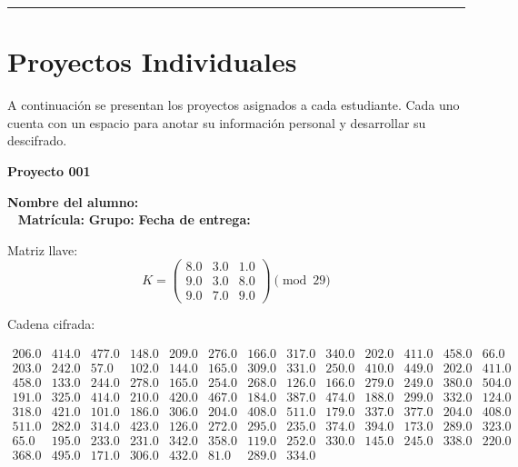 \documentclass[12pt]{article}
\begin{document}
\bigskip
\hrule
\bigskip

\section*{Proyectos Individuales}
A continuación se presentan los proyectos asignados a cada estudiante.
Cada uno cuenta con un espacio para anotar su información personal y desarrollar su descifrado.

\textbf{Proyecto 001}

\textbf{Nombre del alumno:} \underline{\hspace{13cm}}\\\
\vspace{1cm}
\textbf{Matrícula:} \underline{\hspace{4cm}} \hspace{1cm}
\textbf{Grupo:} \underline{\hspace{2cm}}
\textbf{Fecha de entrega:} \underline{\hspace{2cm}}

\medskip

Matriz llave:
\[
K = \begin{pmatrix}
8.0 & 3.0 & 1.0\\
9.0 & 3.0 & 8.0\\
9.0 & 7.0 & 9.0
\end{pmatrix} \pmod{29}
\]

Cadena cifrada:
\begin{center}
$\begin{array}{lllllllllllll}
206.0 & 414.0 & 477.0 & 148.0 & 209.0 & 276.0 & 166.0 & 317.0 & 340.0 & 202.0 & 411.0 & 458.0 & 66.0\\
203.0 & 242.0 & 57.0 & 102.0 & 144.0 & 165.0 & 309.0 & 331.0 & 250.0 & 410.0 & 449.0 & 202.0 & 411.0\\
458.0 & 133.0 & 244.0 & 278.0 & 165.0 & 254.0 & 268.0 & 126.0 & 166.0 & 279.0 & 249.0 & 380.0 & 504.0\\
191.0 & 325.0 & 414.0 & 210.0 & 420.0 & 467.0 & 184.0 & 387.0 & 474.0 & 188.0 & 299.0 & 332.0 & 124.0\\
318.0 & 421.0 & 101.0 & 186.0 & 306.0 & 204.0 & 408.0 & 511.0 & 179.0 & 337.0 & 377.0 & 204.0 & 408.0\\
511.0 & 282.0 & 314.0 & 423.0 & 126.0 & 272.0 & 295.0 & 235.0 & 374.0 & 394.0 & 173.0 & 289.0 & 323.0\\
65.0 & 195.0 & 233.0 & 231.0 & 342.0 & 358.0 & 119.0 & 252.0 & 330.0 & 145.0 & 245.0 & 338.0 & 220.0\\
368.0 & 495.0 & 171.0 & 306.0 & 432.0 & 81.0 & 289.0 & 334.0\\
\end{array}$
\end{center}
\end{document}
